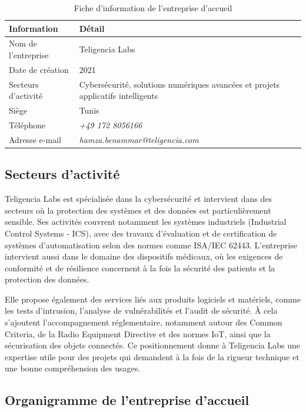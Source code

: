 \begin{table}[H]
\centering
\renewcommand{\arraystretch}{1.3}
\begin{tabular}{|p{5cm}|p{9cm}|}
\hline
\rowcolor{TableHeaderBlue}
\textbf{Information} & \textbf{Détail} \\
\hline
Nom de l'entreprise & Teligencia Labs \\
\hline
Date de création & 2021 \\
\hline
Secteurs d'activité & Cybersécurité, solutions numériques avancées et projets applicatifs intelligents \\
\hline
Siège & Tunis \\
\hline
Téléphone & \textit{+49 172 8056166} \\
\hline
Adresse e-mail & \textit{hamza.benammar@teligencia.com} \\
\hline
\end{tabular}
\caption{Fiche d'information de l'entreprise d'accueil}
\end{table}

\subsection{Secteurs d'activité}

Teligencia Labs est spécialisée dans la cybersécurité et intervient dans des secteurs où la protection des systèmes et des données est particulièrement sensible. Ses activités couvrent notamment les systèmes industriels (Industrial Control Systems - ICS), avec des travaux d'évaluation et de certification de systèmes d'automatisation selon des normes comme ISA/IEC 62443. L'entreprise intervient aussi dans le domaine des dispositifs médicaux, où les exigences de conformité et de résilience concernent à la fois la sécurité des patients et la protection des données.

Elle propose également des services liés aux produits logiciels et matériels, comme les tests d'intrusion, l'analyse de vulnérabilités et l'audit de sécurité. À cela s'ajoutent l'accompagnement réglementaire, notamment autour des Common Criteria, de la Radio Equipment Directive et des normes IoT, ainsi que la sécurisation des objets connectés. Ce positionnement donne à Teligencia Labs une expertise utile pour des projets qui demandent à la fois de la rigueur technique et une bonne compréhension des usages.



\subsection{Organigramme de l'entreprise d'accueil}



